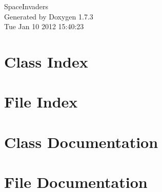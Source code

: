 \documentclass[a4paper]{book}
\begin{document}
\hypersetup{pageanchor=false}
\begin{titlepage}
\vspace*{7cm}
\begin{center}
{\Large SpaceInvaders }\\
\vspace*{1cm}
{\large Generated by Doxygen 1.7.3}\\
\vspace*{0.5cm}
{\small Tue Jan 10 2012 15:40:23}\\
\end{center}
\end{titlepage}
\clearemptydoublepage
{}
\tableofcontents
\clearemptydoublepage
{}
\hypersetup{pageanchor=true}
\chapter{Class Index}

\chapter{File Index}

\chapter{Class Documentation}


\chapter{File Documentation}
















\printindex
\end{document}
